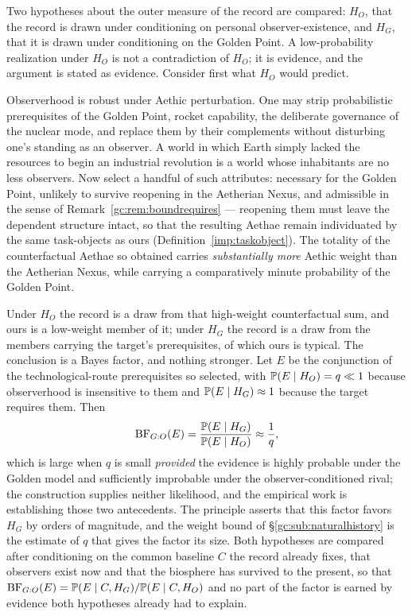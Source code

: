 \begin{principle}
\label{gc:prin:conditioning}
Two hypotheses about the outer measure of the record are compared:
$H_O$, that the record is drawn under conditioning on personal
observer-existence, and $H_G$, that it is drawn under conditioning on
the Golden Point. A low-probability realization under $H_O$ is not a
contradiction of $H_O$; it is evidence, and the argument is stated as
evidence. Consider first what $H_O$ would predict.

Observerhood is robust under Aethic perturbation. One may strip
probabilistic prerequisites of the Golden Point, rocket capability,
the deliberate governance of the nuclear mode, and replace them by
their complements without disturbing one's standing as an observer. A
world in which Earth simply lacked the resources to begin an industrial
revolution is a world whose inhabitants are no less observers. Now select a handful of such attributes: necessary for the Golden Point,
unlikely to survive reopening in the Aetherian Nexus, and admissible in
the sense of Remark~\ref{gc:rem:boundrequires} --- reopening them must
leave the dependent structure intact, so that the resulting Aethae
remain individuated by the same task-objects as ours
(Definition~\ref{imp:taskobject}). The totality of
the counterfactual Aethae so obtained carries \emph{substantially more}
Aethic weight than the Aetherian Nexus, while carrying a comparatively
minute probability of the Golden Point.

Under $H_O$ the record is a draw from that high-weight counterfactual
sum, and ours is a low-weight member of it; under $H_G$ the record is a
draw from the members carrying the target's prerequisites, of which ours
is typical. The conclusion is a Bayes factor, and nothing stronger. Let $E$ be the
conjunction of the technological-route prerequisites so selected, with
$\mathbb{P}(E\mid H_O)=q\ll1$ because observerhood is insensitive to them and
$\mathbb{P}(E\mid H_G)\approx1$ because the target requires them. Then
\begin{equation}\label{gc:eq:bfGO}
\mathrm{BF}_{G:O}(E)=\frac{\mathbb{P}(E\mid H_G)}{\mathbb{P}(E\mid H_O)}\approx\frac1q,
\end{equation}
which is large when $q$ is small \emph{provided} the evidence is highly probable under the Golden model and sufficiently improbable under the observer-conditioned rival; the construction supplies neither likelihood, and the empirical work is establishing those two antecedents.
The principle asserts that this factor favors $H_G$ by orders of
magnitude, and the weight bound of \S\ref{gc:sub:naturalhistory} is
the estimate of $q$ that gives the factor its size. Both hypotheses are
compared after conditioning on the common baseline $C$ the record
already fixes, that observers exist now and that the biosphere has
survived to the present, so that $\mathrm{BF}_{G:O}(E)=\mathbb{P}(E\mid
C,H_G)/\mathbb{P}(E\mid C,H_O)$ and no part of the factor is earned by
evidence both hypotheses already had to explain.
\end{principle}

